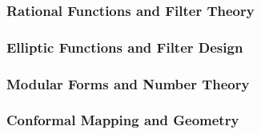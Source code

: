 \subsubsection{Rational Functions and Filter Theory}

\subsubsection{Elliptic Functions and Filter Design}

\subsubsection{Modular Forms and Number Theory}

\subsubsection{Conformal Mapping and Geometry}










